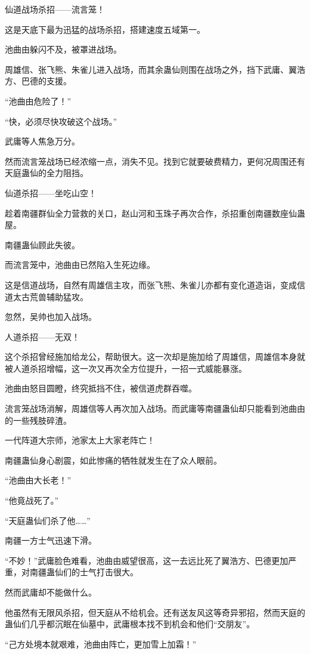 \begin{this_body}
仙道战场杀招——流言笼！

这是天底下最为迅猛的战场杀招，搭建速度五域第一。

池曲由躲闪不及，被罩进战场。

周雄信、张飞熊、朱雀儿进入战场，而其余蛊仙则围在战场之外，挡下武庸、翼浩方、巴德的支援。

“池曲由危险了！”

“快，必须尽快攻破这个战场。”

武庸等人焦急万分。

然而流言笼战场已经浓缩一点，消失不见。找到它就要破费精力，更何况周围还有天庭蛊仙的全力阻挡。

仙道杀招——坐吃山空！

趁着南疆群仙全力营救的关口，赵山河和玉珠子再次合作，杀招重创南疆数座仙蛊屋。

南疆蛊仙顾此失彼。

而流言笼中，池曲由已然陷入生死边缘。

这是信道战场，自然有周雄信主攻，而张飞熊、朱雀儿亦都有变化道造诣，变成信道太古荒兽辅助猛攻。

忽然，吴帅也加入战场。

人道杀招——无双！

这个杀招曾经施加给龙公，帮助很大。这一次却是施加给了周雄信，周雄信本身就被人道杀招增幅，这一次又再次全方位提升，一招一式威能暴涨。

池曲由怒目圆瞪，终究抵挡不住，被信道虎群吞噬。

流言笼战场消解，周雄信等人再次加入战场。而武庸等南疆蛊仙却只能看到池曲由的一些残肢碎渣。

一代阵道大宗师，池家太上大家老阵亡！

南疆蛊仙身心剧震，如此惨痛的牺牲就发生在了众人眼前。

“池曲由大长老！”

“他竟战死了。”

“天庭蛊仙们杀了他……”

南疆一方士气迅速下滑。

“不妙！”武庸脸色难看，池曲由威望很高，这一去远比死了翼浩方、巴德更加严重，对南疆蛊仙们的士气打击很大。

然而武庸却不能做什么。

他虽然有无限风杀招，但天庭从不给机会。还有送友风这等奇异邪招，然而天庭的蛊仙们几乎都沉眠在仙墓中，武庸根本找不到机会和他们“交朋友”。

“己方处境本就艰难，池曲由阵亡，更加雪上加霜！”


\end{this_body}
